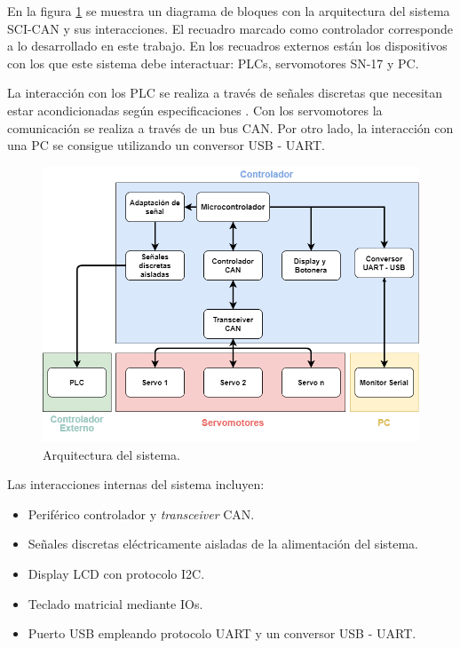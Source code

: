 En la figura \ref{fig:arquitectura_sistema} se muestra un diagrama de bloques con la arquitectura del sistema SCI-CAN y sus interacciones. El recuadro marcado como controlador corresponde a lo desarrollado en este trabajo. En los recuadros externos están los dispositivos con los que este sistema debe interactuar: PLCs, servomotores SN-17 y PC.

La interacción con los PLC se realiza a través de señales discretas que necesitan estar acondicionadas según especificaciones \citep{plan_trabajo}. Con los servomotores la comunicación se realiza a través de un bus CAN. Por otro lado, la interacción con una PC se consigue utilizando un conversor USB - UART.

\begin{figure}[h!]
	\centering
	\includegraphics[scale=.5]{./Figures/Arquitectura_SE.png}
	\caption{Arquitectura del sistema.}
	\label{fig:arquitectura_sistema}
\end{figure}

Las interacciones internas del sistema incluyen:
\begin{itemize}
	\item Periférico controlador y \textit{transceiver} CAN.
	\item Señales discretas eléctricamente aisladas de la alimentación del sistema.
	\item Display LCD con protocolo I2C.
	\item Teclado matricial mediante IOs.
	\item Puerto USB empleando protocolo UART y un conversor USB - UART.
\end{itemize}

